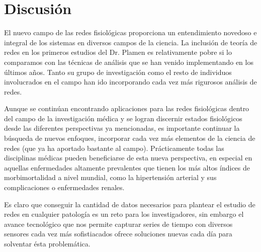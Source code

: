 \documentclass[twoside,twocolumn]{article}
\begin{document}
\section{Discusión}
El nuevo campo de las redes fisiológicas proporciona un entendimiento novedoso e integral de los sistemas en diversos campos de la ciencia.
La inclusión de teoría de redes en los primeros estudios del Dr. Plamen es relativamente pobre si lo comparamos con las técnicas de análisis que se han venido implementando en los últimos años.
Tanto su grupo de investigación como el resto de individuos involucrados en el campo han ido incorporando cada vez más rigurosos análisis de redes.

Aunque se continúan encontrando aplicaciones para las redes fisiológicas dentro del campo de la investigación médica y se logran discernir estados fisiológicos desde las diferentes perspectivas ya mencionadas, es importante continuar la búsqueda de nuevos enfoques, incorporar cada vez más elementos de la ciencia de redes (que ya ha aportado bastante al campo). 
Prácticamente todas las disciplinas médicas pueden beneficiarse de esta nueva perspectiva, en especial en aquellas enfermedades altamente prevalentes que tienen los más altos índices de morbimortalidad a nivel mundial, como la hipertensión arterial y sus complicaciones o enfermedades renales.

Es claro que conseguir la cantidad de datos necesarios para plantear el estudio de redes en cualquier patología es un reto para los investigadores, sin embargo el avance tecnológico que nos permite capturar series de tiempo con diversos sensores cada vez más sofistiacados ofrece soluciones nuevas cada día para solventar ésta problemática.

\renewcommand\refname{Referencias}
\printbibliography
\end{document}
